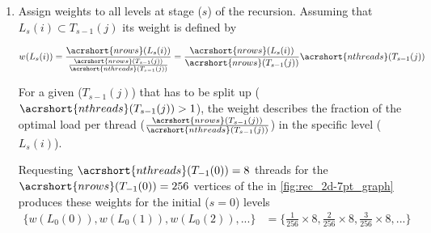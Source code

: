 \begin{enumerate}
	\item  Assign weights to all levels at stage ($s$) of the recursion. Assuming that $L_s(i) \subset T_{s-1}(j)$ its weight is defined by
	
	\begin{align*}
		w(L_s(i)) &= \frac{\acrshort{nrows}(L_s(i))}{\frac{\acrshort{nrows}(T_{s-1}(j))}{\acrshort{nthreads}(T_{s-1}(j))}} = \frac{\acrshort{nrows}(L_s(i))}{\acrshort{nrows}(T_{s-1}(j))}  \acrshort{nthreads}(T_{s-1}(j))\\
	\end{align*}
	
	 For a given \levelGroup ($T_{s-1}(j)$) that has to be split up ( $\acrshort{nthreads}(T_{s-1}(j)) > 1$), the weight describes the fraction of the optimal load per thread  ($\frac{\acrshort{nrows}(T_{s-1}(j))}{\acrshort{nthreads}(T_{s-1}(j))}$) in the specific level ($L_s(i)$).

	Requesting $\acrshort{nthreads}(T_{-1}(0))=8$ threads for the $\acrshort{nrows}(T_{-1}(0)) = 256$ vertices of the \stex in \cref{fig:rec_2d-7pt_graph} produces these weights for the initial ($s=0$) levels
	\begin{align*}
		\{w(L_0(0)), w(L_0(1)), w(L_0(2)), ...\} &= \{\frac{1}{256} \times 8 , \frac{2}{256} \times 8 , \frac{3}{256} \times 8 , ...\}
	\end{align*}
	

\end{enumerate}
